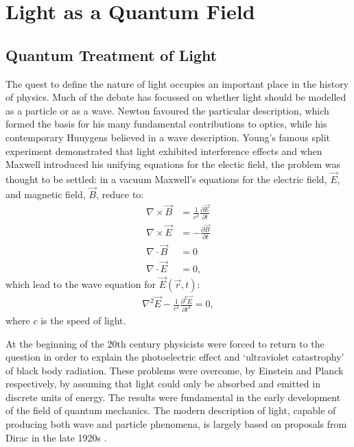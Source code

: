 \chapter{Light as a Quantum Field} 
\label{ch:Light}

\section{Quantum Treatment of Light}

The quest to define the nature of light occupies an important place in the history of physics. Much of the debate has focussed on whether light should be modelled as a particle or as a wave. Newton favoured the particular description, which formed the basis for his many fundamental contributions to optics, while his contemporary Huuygens believed in a wave description. Young's famous split experiment demonstrated that light exhibited interference effects and when Maxwell introduced his unifying equations for the electic field, the problem was thought to be settled: in a vacuum Maxwell's equations for the electric field, $\vec{E}$, and magnetic field, $\vec{B}$, reduce to:
\begin{align}
  \nabla \times \vec{B} &= \frac{1}{c^2} \frac{\partial \vec{E}}{\partial t} \label{maxwell_be} \\
  \nabla \times \vec{E} &= - \frac{\partial \vec{B}}{\partial t}\\
  \nabla \cdot \vec{B} &= 0 \\
  \nabla \cdot \vec{E} &= 0,
\end{align}
which lead to the wave equation for $\vec{E}(\vec{r}, t)$:
\begin{align}\label{wave_eq}
  \nabla^2\vec{E} - \frac{1}{c^2} \frac{\partial^2 \vec{E}}{\partial t^2} = 0,
\end{align}
where $c$ is the speed of light.

At the beginning of the 20th century physicists were forced to return to the question in order to explain the photoelectric effect and `ultraviolet catastrophy' of black body radiation. These problems were overcome, by Einstein \cite{eistein_photoelectric} and Planck \cite{planck_constant} respectively, by assuming that light could only be absorbed and emitted in discrete units of energy. The results were fundamental in the early development of the field of quantum mechanics. The modern description of light, capable of producing both wave and particle phenomena, is largely based on proposals from Dirac in the late 1920s \cite{dirac_1927}.

